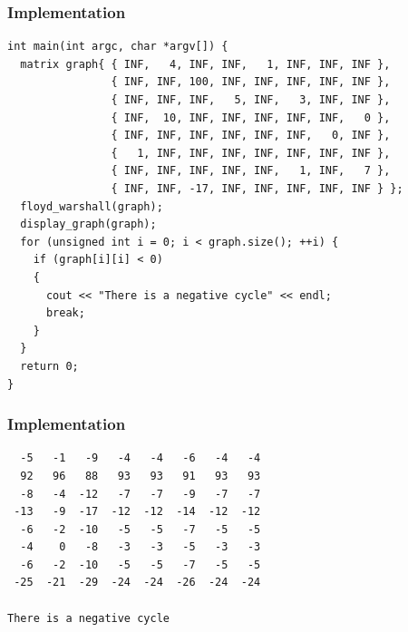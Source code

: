 \documentclass{beamer}
\newcommand{\uvalink}[2]{UVa Online Judge (http://uva.onlinejudge.org)
  problem number \href{#2}{\textcolor{blue}{#1}.}}
\newcommand{\spojlink}[2]{Sphere Online Judge (http://www.spoj.com)
  problem: \href{#2}{\textcolor{blue}{#1}.}}
\newcounter{exo}
\newcommand{\exo}{
  \addtocounter{exo}{1}
  Exercice \arabic{exo}
}
\begin{document}
\begin{frame}[containsverbatim]
\frametitle{Implementation}

\scriptsize
\begin{lstlisting}
int main(int argc, char *argv[]) {
  matrix graph{ { INF,   4, INF, INF,   1, INF, INF, INF },
                { INF, INF, 100, INF, INF, INF, INF, INF },
                { INF, INF, INF,   5, INF,   3, INF, INF },
                { INF,  10, INF, INF, INF, INF, INF,   0 },
                { INF, INF, INF, INF, INF, INF,   0, INF },
                {   1, INF, INF, INF, INF, INF, INF, INF },
                { INF, INF, INF, INF, INF,   1, INF,   7 },
                { INF, INF, -17, INF, INF, INF, INF, INF } };
  floyd_warshall(graph);
  display_graph(graph);
  for (unsigned int i = 0; i < graph.size(); ++i) {
    if (graph[i][i] < 0)
    {
      cout << "There is a negative cycle" << endl;
      break;
    }
  }
  return 0;
}
\end{lstlisting}

\end{frame}

\begin{frame}[containsverbatim]
\frametitle{Implementation}

\scriptsize
\begin{verbatim}
  -5   -1   -9   -4   -4   -6   -4   -4
  92   96   88   93   93   91   93   93
  -8   -4  -12   -7   -7   -9   -7   -7
 -13   -9  -17  -12  -12  -14  -12  -12
  -6   -2  -10   -5   -5   -7   -5   -5
  -4    0   -8   -3   -3   -5   -3   -3
  -6   -2  -10   -5   -5   -7   -5   -5
 -25  -21  -29  -24  -24  -26  -24  -24

There is a negative cycle
\end{verbatim}

\end{frame}

\fi

\end{document}
